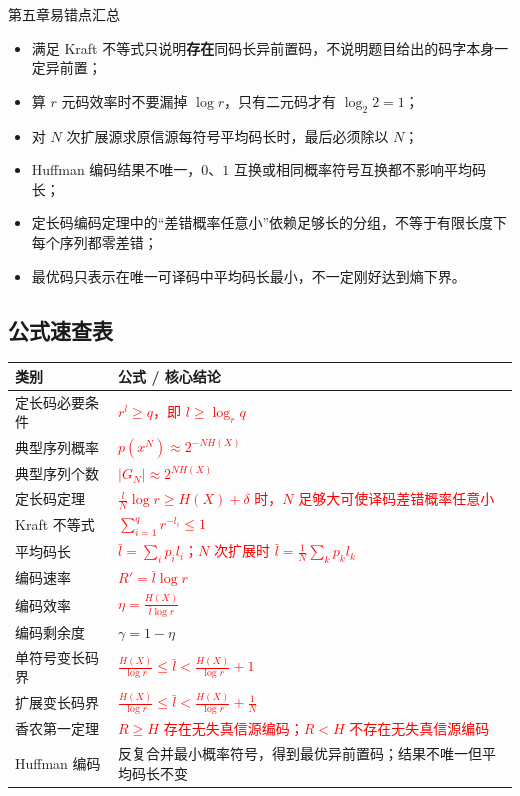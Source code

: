 \begin{warningBox}{第五章易错点汇总}
\begin{itemize}
  \item 满足 Kraft 不等式只说明\textbf{存在}同码长异前置码，不说明题目给出的码字本身一定异前置；
  \item 算 $r$ 元码效率时不要漏掉 $\log r$，只有二元码才有 $\log_2 2=1$；
  \item 对 $N$ 次扩展源求原信源每符号平均码长时，最后必须除以 $N$；
  \item Huffman 编码结果不唯一，$0$、$1$ 互换或相同概率符号互换都不影响平均码长；
  \item 定长码编码定理中的“差错概率任意小”依赖足够长的分组，不等于有限长度下每个序列都零差错；
  \item 最优码只表示在唯一可译码中平均码长最小，不一定刚好达到熵下界。
\end{itemize}
\end{warningBox}

\subsection{公式速查表}

{\scriptsize
\begin{tabularx}{\textwidth}{@{}l>{\raggedright\arraybackslash}X@{}}
\toprule
\textbf{类别} & \textbf{公式 / 核心结论} \\
\midrule
定长码必要条件 & \textcolor{Red}{$r^l\ge q$，即 $l\ge\log_r q$} \\
\midrule
典型序列概率 & \textcolor{Red}{$p(x^N)\approx2^{-N H(X)}$} \\
\midrule
典型序列个数 & \textcolor{Red}{$|G_N|\approx2^{N H(X)}$} \\
\midrule
定长码定理 & \textcolor{Red}{$\frac{l}{N}\log r\ge H(X)+\delta$ 时，$N$ 足够大可使译码差错概率任意小} \\
\midrule
Kraft 不等式 & \textcolor{Red}{$\sum_{i=1}^{q} r^{-l_i}\le1$} \\
\midrule
平均码长 & \textcolor{Red}{$\bar l=\sum_i p_i l_i$；$N$ 次扩展时 $\bar l=\frac1N\sum_k p_k l_k$} \\
\midrule
编码速率 & \textcolor{Red}{$R'=\bar l\log r$} \\
\midrule
编码效率 & \textcolor{Red}{$\eta=\frac{H(X)}{\bar l\log r}$} \\
\midrule
编码剩余度 & $\gamma=1-\eta$ \\
\midrule
单符号变长码界 & \textcolor{Red}{$\frac{H(X)}{\log r}\le\bar l<\frac{H(X)}{\log r}+1$} \\
\midrule
扩展变长码界 & \textcolor{Red}{$\frac{H(X)}{\log r}\le\bar l<\frac{H(X)}{\log r}+\frac1N$} \\
\midrule
香农第一定理 & \textcolor{Red}{$R\ge H$ 存在无失真信源编码；$R<H$ 不存在无失真信源编码} \\
\midrule
Huffman 编码 & 反复合并最小概率符号，得到最优异前置码；结果不唯一但平均码长不变 \\
\bottomrule
\end{tabularx}
}

